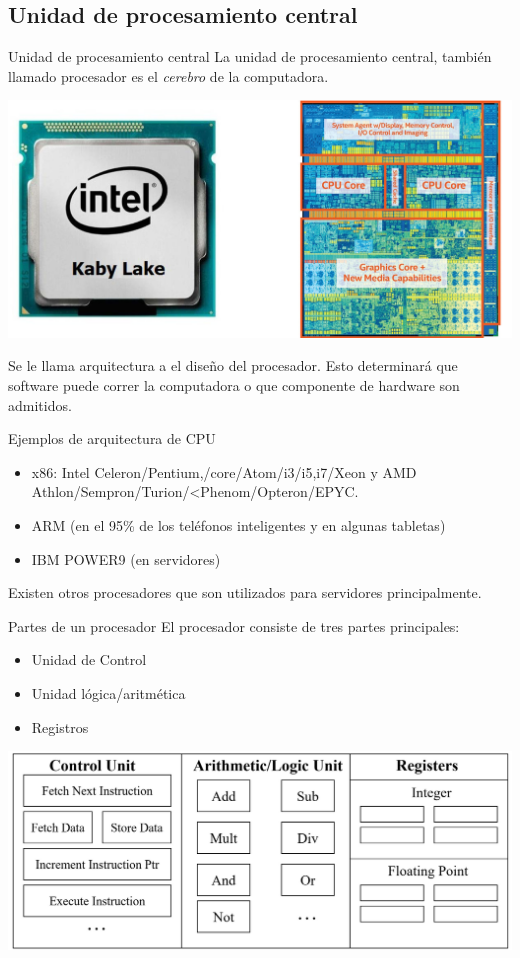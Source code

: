 \documentclass[11pt]{beamer}
\begin{document}
	\subsection{Unidad de procesamiento central}
		\begin{frame}{Unidad de procesamiento central}
			La unidad de procesamiento central, también llamado procesador es el \textit{cerebro} de la computadora.
			
			\begin{center}
				\includegraphics[scale=0.67]{cpu.jpg}
			\end{center}
			
			Se le llama arquitectura a el diseño del procesador. Esto determinará que software puede correr la computadora o que componente de hardware son admitidos.
		\end{frame}
		\begin{frame}{Ejemplos de arquitectura de CPU}
			\begin{itemize}
				\item x86: Intel Celeron/Pentium,/core/Atom/i3/i5,i7/Xeon y AMD Athlon/Sempron/Turion/<Phenom/Opteron/EPYC.
				\item ARM (en el 95\% de los teléfonos inteligentes y en algunas tabletas)
				\item IBM POWER9 (en servidores)
			\end{itemize}
			Existen otros procesadores que son utilizados para servidores principalmente.
		\end{frame}
		\begin{frame}{Partes de un procesador}
			El procesador consiste de tres partes principales:
			\begin{itemize}
				\item Unidad de Control
				\item Unidad lógica/aritmética
				\item Registros
			\end{itemize}

			\includegraphics[width=\textwidth]{cpu_parts.jpg}

		\end{frame}
\end{document}
